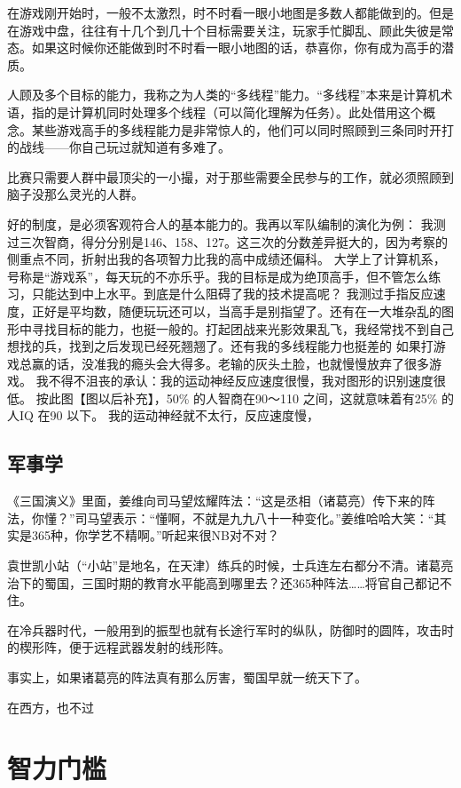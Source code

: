 在游戏刚开始时，一般不太激烈，时不时看一眼小地图是多数人都能做到的。但是在游戏中盘，往往有十几个到几十个目标需要关注，玩家手忙脚乱、顾此失彼是常态。如果这时候你还能做到时不时看一眼小地图的话，恭喜你，你有成为高手的潜质。

人顾及多个目标的能力，我称之为人类的“多线程”能力。“多线程”本来是计算机术语，指的是计算机同时处理多个线程（可以简化理解为任务）。此处借用这个概念。某些游戏高手的多线程能力是非常惊人的，他们可以同时照顾到三条同时开打的战线——你自己玩过就知道有多难了。

比赛只需要人群中最顶尖的一小撮，对于那些需要全民参与的工作，就必须照顾到脑子没那么灵光的人群。

好的制度，是必须客观符合人的基本能力的。我再以军队编制的演化为例：
我测过三次智商，得分分别是146、158、127。这三次的分数差异挺大的，因为考察的侧重点不同，折射出我的各项智力比我的高中成绩还偏科。
大学上了计算机系，号称是“游戏系”，每天玩的不亦乐乎。我的目标是成为绝顶高手，但不管怎么练习，只能达到中上水平。到底是什么阻碍了我的技术提高呢？
我测过手指反应速度，正好是平均数，随便玩玩还可以，当高手是别指望了。还有在一大堆杂乱的图形中寻找目标的能力，也挺一般的。打起团战来光影效果乱飞，我经常找不到自己想找的兵，找到之后发现已经死翘翘了。还有我的多线程能力也挺差的
如果打游戏总赢的话，没准我的瘾头会大得多。老输的灰头土脸，也就慢慢放弃了很多游戏。
我不得不沮丧的承认：我的运动神经反应速度很慢，我对图形的识别速度很低。
按此图【图以后补充】，50\% 的人智商在90～110 之间，这就意味着有25\% 的人IQ 在90 以下。
我的运动神经就不太行，反应速度慢，

\subsection{军事学}
《三国演义》里面，姜维向司马望炫耀阵法：“这是丞相（诸葛亮）传下来的阵法，你懂？”司马望表示：“懂啊，不就是九九八十一种变化。”姜维哈哈大笑：“其实是365种，你学艺不精啊。”听起来很NB对不对？

袁世凯小站（“小站”是地名，在天津）练兵的时候，士兵连左右都分不清。诸葛亮治下的蜀国，三国时期的教育水平能高到哪里去？还365种阵法……将官自己都记不住。

在冷兵器时代，一般用到的振型也就有长途行军时的纵队，防御时的圆阵，攻击时的楔形阵，便于远程武器发射的线形阵。


事实上，如果诸葛亮的阵法真有那么厉害，蜀国早就一统天下了。

在西方，也不过

\section{智力门槛}

